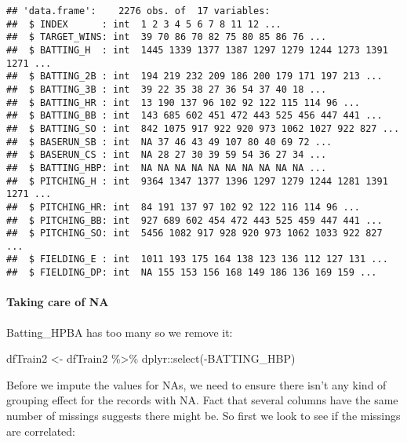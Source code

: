 \documentclass[
]{article}
\newenvironment{Shaded}{\begin{snugshade}}{\end{snugshade}}
\newcommand{\FunctionTok}[1]{\textcolor[rgb]{0.00,0.00,0.00}{#1}}
\newcommand{\NormalTok}[1]{#1}
\newcommand{\OtherTok}[1]{\textcolor[rgb]{0.56,0.35,0.01}{#1}}
\newcommand{\SpecialCharTok}[1]{\textcolor[rgb]{0.00,0.00,0.00}{#1}}
\begin{document}
\begin{verbatim}
## 'data.frame':    2276 obs. of  17 variables:
##  $ INDEX      : int  1 2 3 4 5 6 7 8 11 12 ...
##  $ TARGET_WINS: int  39 70 86 70 82 75 80 85 86 76 ...
##  $ BATTING_H  : int  1445 1339 1377 1387 1297 1279 1244 1273 1391 1271 ...
##  $ BATTING_2B : int  194 219 232 209 186 200 179 171 197 213 ...
##  $ BATTING_3B : int  39 22 35 38 27 36 54 37 40 18 ...
##  $ BATTING_HR : int  13 190 137 96 102 92 122 115 114 96 ...
##  $ BATTING_BB : int  143 685 602 451 472 443 525 456 447 441 ...
##  $ BATTING_SO : int  842 1075 917 922 920 973 1062 1027 922 827 ...
##  $ BASERUN_SB : int  NA 37 46 43 49 107 80 40 69 72 ...
##  $ BASERUN_CS : int  NA 28 27 30 39 59 54 36 27 34 ...
##  $ BATTING_HBP: int  NA NA NA NA NA NA NA NA NA NA ...
##  $ PITCHING_H : int  9364 1347 1377 1396 1297 1279 1244 1281 1391 1271 ...
##  $ PITCHING_HR: int  84 191 137 97 102 92 122 116 114 96 ...
##  $ PITCHING_BB: int  927 689 602 454 472 443 525 459 447 441 ...
##  $ PITCHING_SO: int  5456 1082 917 928 920 973 1062 1033 922 827 ...
##  $ FIELDING_E : int  1011 193 175 164 138 123 136 112 127 131 ...
##  $ FIELDING_DP: int  NA 155 153 156 168 149 186 136 169 159 ...
\end{verbatim}

\hypertarget{taking-care-of-na}{%
\paragraph{Taking care of NA}\label{taking-care-of-na}}

Batting\_HPBA has too many so we remove it:

\begin{Shaded}
\begin{Highlighting}[]
\NormalTok{dfTrain2 }\OtherTok{\textless{}{-}}\NormalTok{ dfTrain2 }\SpecialCharTok{\%\textgreater{}\%}
\NormalTok{  dplyr}\SpecialCharTok{::}\FunctionTok{select}\NormalTok{(}\SpecialCharTok{{-}}\NormalTok{BATTING\_HBP) }
\end{Highlighting}
\end{Shaded}

Before we impute the values for NAs, we need to ensure there isn't any
kind of grouping effect for the records with NA. Fact that several
columns have the same number of missings suggests there might be. So
first we look to see if the missings are correlated:
\end{document}
